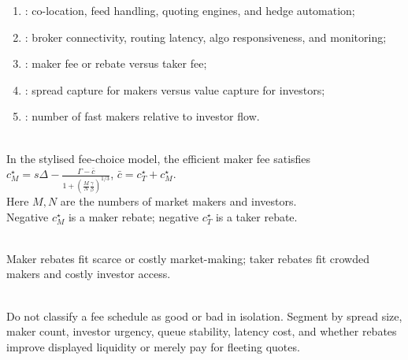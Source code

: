 \documentclass[a4paper,oneside,openany]{book}
\begin{document}
\begin{taxonomy} 
\begin{enumerate}[label=\roman*.]
\setlength{\itemsep}{0pt}
\item {}: co-location, feed handling, quoting engines, and hedge automation;
\item {}: broker connectivity, routing latency, algo responsiveness, and monitoring;
\item {}: maker fee or rebate versus taker fee;
\item {}: spread capture for makers versus value capture for investors;
\item {}: number of fast makers relative to investor flow.
\end{enumerate}
\end{taxonomy}

\begin{definition} \\
In the stylised fee-choice model, the efficient maker fee satisfies $c_M^\star=s\Delta-\frac{\Gamma-\bar{c}}{1+\left(\frac{M}{N}\frac{\gamma}{\beta}\right)^{1/3}}$, $\bar{c}=c_T^\star+c_M^\star$.\\
Here $M,N$ are the numbers of market makers and investors.\\
Negative $c_M^\star$ is a maker rebate; negative $c_T^\star$ is a taker rebate.
\end{definition}

\begin{caveat} \\
Maker rebates fit scarce or costly market-making; taker rebates fit crowded makers and costly investor access.
\end{caveat}

\begin{practitionernote} \\
Do not classify a fee schedule as good or bad in isolation. Segment by spread size, maker count, investor urgency, queue stability, latency cost, and whether rebates improve displayed liquidity or merely pay for fleeting quotes.
\end{practitionernote}
\end{document}
